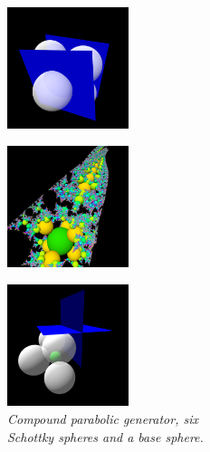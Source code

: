 \begin{figure}[h!tbp]
 \begin{minipage}[t]{0.5\hsize}
  \begin{minipage}{0.25\hsize}
   \center
    \includegraphics[width=1.4in, height=1.4in, keepaspectratio]{./img/application/3dGen/compParabolicGen.pdf}
    \label{fig:compParabolicGen}
  \end{minipage}
  \hspace*{\fill}
  \begin{minipage}{0.25\hsize}
   \center
   \includegraphics[width=1.4in, height=1.4in, keepaspectratio]{./img/application/3dGen/compParabolicOrb.pdf}
   \label{fig:compParabolicOrb}
  \end{minipage}
  \hspace*{\fill}
  \caption{\textit{Compound parabolic generator, six \\Schottky spheres
  and a base sphere.}}
  \label{fig:compParabolic}
 \end{minipage}
 \hspace*{\fill}
 \begin{minipage}[t]{0.5\hsize}
  \begin{minipage}{0.25\hsize}
   \center
   \includegraphics[width=1.4in, height=1.4in, keepaspectratio]{./img/application/3dGen/rotationGen.pdf}

\end{minipage}
\end{minipage}
\end{figure}
